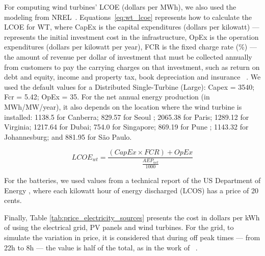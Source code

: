 For computing wind turbines' LCOE (dollars per MWh), we also used the modeling from NREL~\cite{nrel_wt_costs_2021}. Equations~\eqref{eq:wt_lcoe} represents how to calculate the LCOE for WT, where CapEx is the capital expenditures (dollars per kilowatt) --- represents the initial investment cost in the infrastructure, OpEx is the operation expenditures (dollars per kilowatt per year), FCR is the fixed charge rate (\%) --- the amount of revenue per dollar of investment that must be collected annually from customers to pay the carrying charges on that investment, such as return on debt and equity, income and property tax, book depreciation and insurance ~\cite{nrel_economic_wt_1995}. We used the default values for a Distributed Single-Turbine (Large): Capex = 3540; Fcr = 5.42; OpEx = 35. For the net annual energy production (in MWh/MW/year), it also depends on the location where the wind turbine is installed:  1138.5 for Canberra; 829.57 for Seoul ;  2065.38 for Paris; 1289.12 for Virginia;  1217.64 for Dubai;   754.0 for Singapore;  869.19 for Pune ;  1143.32 for Johannesburg; and  881.95 for São Paulo.

\begin{equation} \label{eq:wt_lcoe}
  LCOE_{wt} = \frac{ (CapEx \times FCR) + OpEx}{ \frac{AEP_{net}}{1000}   }
\end{equation}

For the batteries, we used values from a technical report of the US Department of Energy \cite{battery_lcos_2022}, where each kilowatt hour of energy discharged (LCOS) has a price of 20 cents.

Finally, Table \ref{tab:price_electricity_sources} presents the cost in dollars per kWh of using the electrical grid, PV panels and wind turbines. For the grid, to simulate the variation in price, it is considered that during off peak times --- from 22h to 8h --- the value is half of the total, as in the work of ~\citet{KHODAYARSERESHT2023_energycarbonaware_vm}.

